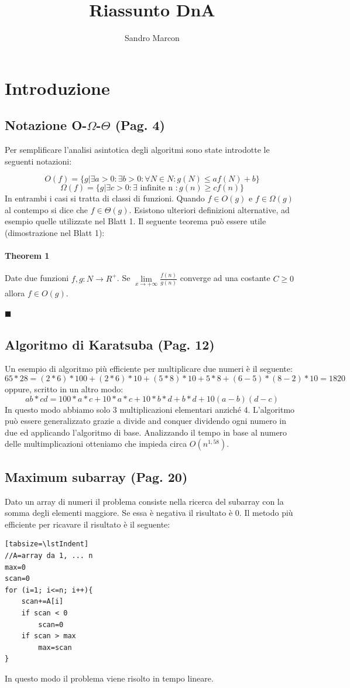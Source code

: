 \documentclass[a4paper]{book}
\author{Sandro Marcon}
\title{Riassunto DnA}
\newenvironment{mytheorem}[1]{\subsubsection*{Theorem #1}}{\begin{flushright}$\blacksquare$\end{flushright}}
\newcommand{\lstIndent}{4}
\begin{document}
\tableofcontents
\chapter{Introduzione}
\section{Notazione O-$\Omega$-$\Theta$ (Pag. 4)}
Per semplificare l'analisi asintotica degli algoritmi sono state introdotte le 
seguenti notazioni:

$$O(f)=\{ g|\exists a>0: \exists b>0: \forall N \in N : g(N)\leq af(N)+b \}$$
$$\Omega (f)=\{ g|\exists c>0: \exists \mbox{ infinite n } : g(n) \geq cf(n) \}$$
In entrambi i casi si tratta di classi di funzioni. Quando $f \in O(g)$ e $f \in \Omega (g)$ al contempo si dice che $f \in \Theta (g)$. Esistono ulteriori definizioni alternative, ad esempio quelle utilizzate nel Blatt 1. Il seguente teorema può essere utile (dimostrazione nel Blatt 1):
\newtheorem{theorem}{Theorem}
\begin{mytheorem}{1}
Date due funzioni $ f,g: N \rightarrow R^{+} $. Se $ \lim\limits_{x \rightarrow +\infty} \frac{f(n)}{g(n)} $ converge ad una costante $C\geq 0$ allora $f \in O(g)$.
\end{mytheorem}
\section{Algoritmo di Karatsuba (Pag. 12)}
Un esempio di algoritmo più efficiente per multiplicare due numeri è il seguente:
$$65 * 28 = (2 * 6) * 100 + (2 * 6) * 10 + (5 * 8) * 10 + 5 * 8 + (6-5)*(8-2) * 10 = 1820 $$
oppure, scritto in un altro modo:
\[ab*cd=100*a*c+10*a*c+10*b*d+b*d+10(a-b)(d-c)\]
In questo modo abbiamo solo 3 multiplicazioni elementari anziché 4. L'algoritmo può essere generalizzato grazie a divide and conquer dividendo ogni numero in due ed applicando l'algoritmo di base. Analizzando il tempo in base al numero delle multimplicazioni otteniamo che impieda circa $O(n^{1,58})$.
\section{Maximum subarray (Pag. 20)}
Dato un array di numeri il problema consiste nella ricerca del subarray con la somma degli elementi maggiore. Se essa è negativa il risultato è 0. Il metodo più efficiente per ricavare il risultato è il seguente:
\begin{lstlisting}[tabsize=\lstIndent][tabsize=\lstIndent]
//A=array da 1, ... n	
max=0	
scan=0
for (i=1; i<=n; i++){	
	scan+=A[i]
	if scan < 0
		scan=0
	if scan > max 
		max=scan
}			
\end{lstlisting}
In questo modo il problema viene risolto in tempo lineare.	
\end{document}
